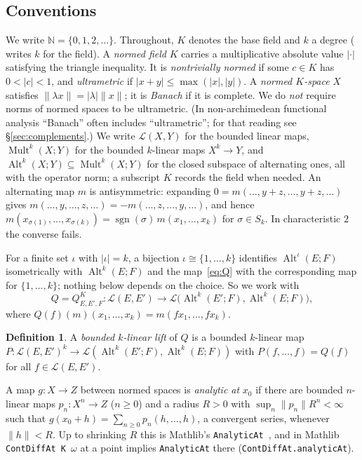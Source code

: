 \documentclass[11pt]{amsart}
\theoremstyle{definition}
\newtheorem{definition}[theorem]{Definition}
\theoremstyle{remark}
\numberwithin{equation}{section}
\newcommand{\N}{\mathbb{N}}
\newcommand{\cL}{\mathcal{L}}
\newcommand{\Alt}{\operatorname{Alt}}
\newcommand{\Mult}{\operatorname{Mult}}
\newcommand{\sgn}{\operatorname{sgn}}
\newcommand{\abs}[1]{\lvert #1\rvert}
\newcommand{\norm}[1]{\lVert #1\rVert}
\begin{document}
\subsection{Conventions}
We write $\N=\{0,1,2,\dots\}$. Throughout, $K$ denotes the base field and $k$ a degree (\cite{M} writes $k$ for
the field). A \emph{normed field} $K$ carries a multiplicative absolute value $\abs{\cdot}$ satisfying the triangle inequality. It is
\emph{nontrivially normed} if some $c\in K$ has $0<\abs c<1$, and \emph{ultrametric} if $\abs{x+y}\le\max(\abs x,\abs y)$.
A \emph{normed $K$\nobreakdash-space} $X$ satisfies $\norm{\lambda x}=\abs\lambda\norm x$; it is \emph{Banach} if it is complete. We
do \emph{not} require norms of normed spaces to be ultrametric. (In non-archimedean functional analysis ``Banach''
often includes ``ultrametric''; for that reading see \S\ref{sec:complements}.) We write $\cL(X,Y)$ for the bounded
linear maps, $\Mult^k(X;Y)$ for the bounded $k$\nobreakdash-linear maps $X^k\to Y$, and $\Alt^k(X;Y)\subseteq\Mult^k(X;Y)$ for the
closed subspace of alternating ones, all with the operator norm; a subscript $K$ records the field when needed. An
alternating map $m$ is antisymmetric: expanding $0=m(\dots,y+z,\dots,y+z,\dots)$ gives
$m(\dots,y,\dots,z,\dots)=-m(\dots,z,\dots,y,\dots)$, and hence
$m(x_{\sigma(1)},\dots,x_{\sigma(k)})=\sgn(\sigma)\,m(x_1,\dots,x_k)$ for $\sigma\in S_k$. In characteristic $2$ the
converse fails.

For a finite set $\iota$ with $\abs\iota=k$, a bijection $\iota\cong\{1,\dots,k\}$ identifies $\Alt^\iota(E;F)$
isometrically with $\Alt^k(E;F)$ and the map~\eqref{eq:Q} with the corresponding map for $\{1,\dots,k\}$; nothing below
depends on the choice. So we work with
\[
Q=Q^K_{E,E',F}\colon\cL(E,E')\to\cL\bigl(\Alt^k(E';F),\Alt^k(E;F)\bigr),
\]
where $Q(f)(m)(x_1,\dots,x_k)=m(fx_1,\dots,fx_k)$.

\begin{definition}\label{def:lift}
A \emph{bounded $k$\nobreakdash-linear lift} of $Q$ is a bounded $k$\nobreakdash-linear map
$P\colon\cL(E,E')^k\to\cL(\Alt^k(E';F),\Alt^k(E;F))$ with $P(f,\dots,f)=Q(f)$ for all $f\in\cL(E,E')$.
\end{definition}

A map $g\colon X\to Z$ between normed spaces is \emph{analytic at} $x_0$ if there are bounded $n$\nobreakdash-linear maps
$p_n\colon X^n\to Z$ ($n\ge0$) and a radius $R>0$ with $\sup_n\norm{p_n}R^n<\infty$ such that
$g(x_0+h)=\sum_{n\ge0}p_n(h,\dots,h)$, a convergent series, whenever $\norm h<R$. Up to shrinking $R$ this is
Mathlib's \texttt{AnalyticAt}~\cite{docs}, and in Mathlib \texttt{ContDiffAt K $\omega$} at a point implies
\texttt{AnalyticAt} there (\texttt{ContDiffAt.analyticAt}).
\end{document}
